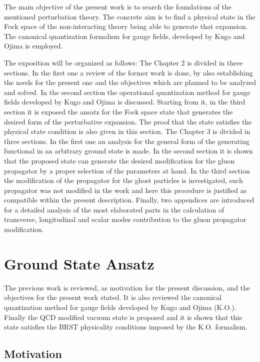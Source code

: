 \documentclass[12pt,letterpaper]{report}
\begin{document}
The main objective of the present work is to search the
foundations of the mentioned perturbation theory. The concrete aim
is to find a physical state in the Fock space of the
non-interacting theory being able to generate that expansion. The
canonical quantization formalism for gauge fields, developed by
Kugo and Ojima is employed.

The exposition will be organized as follows: The Chapter 2 is
divided in three sections. In the first one a review of the former
work \cite{Cabo} is done, by also establishing the needs for the
present one and the objectives which are planned to be analyzed
and solved. In the second section the operational quantization
method for gauge fields developed by Kugo and Ojima is discussed.
Starting from it, in the third section it is exposed the ansatz
for the Fock space state that generates the desired form of the
perturbative expansion. The proof that the state satisfies the
physical state condition is also given in this section. The
Chapter 3 is divided in three sections. In the first one an
analysis for the general form of the generating functional in an
arbitrary ground state is made. In the second section it is shown
that the proposed state can generate the desired modification for
the gluon propagator by a proper selection of the parameters at
hand. In the third section the modification of the propagator for
the ghost particles is investigated, such propagator was not
modified in the work \cite{Cabo} and here this procedure is
justified as compatible within the present description. Finally,
two appendices are introduced for a detailed analysis of the most
elaborated parts in the calculation of transverse, longitudinal
and scalar modes contribution to the gluon propagator
modification.

\chapter{Ground State Ansatz}

The previous work \cite{Cabo} is reviewed, as motivation for the
present discussion, and the objectives for the present work
stated. It is also reviewed the canonical quantization method for
gauge fields developed by Kugo and Ojima (K.O.). Finally the QCD
modified vacuum state is proposed and it is shown that this state
satisfies the BRST physicality conditions imposed by the K.O.
formalism.

\section{Motivation}
\end{document}
